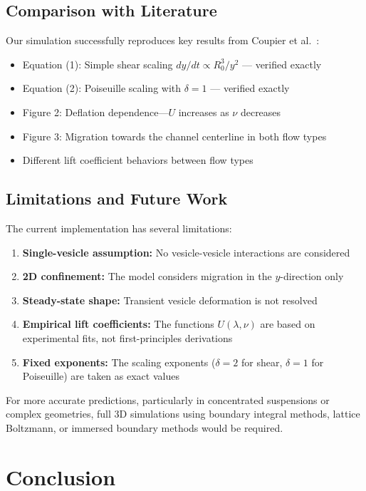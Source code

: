 \documentclass{article}
\begin{document}
\subsection{Comparison with Literature}

Our simulation successfully reproduces key results from Coupier et al.~\cite{coupier2009}:
\begin{itemize}
    \item[\checkmark] Equation (1): Simple shear scaling $dy/dt \propto R_0^3/y^2$ --- verified exactly
    \item[\checkmark] Equation (2): Poiseuille scaling with $\delta = 1$ --- verified exactly
    \item[\checkmark] Figure 2: Deflation dependence---$U$ increases as $\nu$ decreases
    \item[\checkmark] Figure 3: Migration towards the channel centerline in both flow types
    \item[\checkmark] Different lift coefficient behaviors between flow types
\end{itemize}

\subsection{Limitations and Future Work}

The current implementation has several limitations:
\begin{enumerate}
    \item \textbf{Single-vesicle assumption:} No vesicle-vesicle interactions are considered
    \item \textbf{2D confinement:} The model considers migration in the $y$-direction only
    \item \textbf{Steady-state shape:} Transient vesicle deformation is not resolved
    \item \textbf{Empirical lift coefficients:} The functions $U(\lambda, \nu)$ are based on experimental fits, not first-principles derivations
    \item \textbf{Fixed exponents:} The scaling exponents ($\delta = 2$ for shear, $\delta = 1$ for Poiseuille) are taken as exact values
\end{enumerate}

For more accurate predictions, particularly in concentrated suspensions or complex geometries, full 3D simulations using boundary integral methods, lattice Boltzmann, or immersed boundary methods would be required.

\section{Conclusion}
\end{document}
